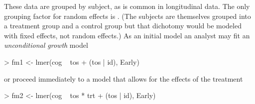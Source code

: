 \documentclass[12pt]{article}
\begin{document}
These data are grouped by subject, as is common in longitudinal data.
The only grouping factor for random effects is .  (The
subjects are themselves grouped into a treatment group and a control
group but that dichotomy would be modeled with fixed effects, not
random effects.)  As an initial model an analyst may fit an
\emph{unconditional growth} model~\cite[ch.~4]{Sing:Will:2003}
\begin{Schunk}
\begin{Sinput}
> fm1 <- lmer(cog ~ tos + (tos | id), Early)
\end{Sinput}
\end{Schunk}
or proceed immediately to a model that allows for the effects of the
treatment 
\begin{Schunk}
\begin{Sinput}
> fm2 <- lmer(cog ~ tos * trt + (tos | id), Early)
\end{Sinput}
\end{Schunk}
\end{document}
